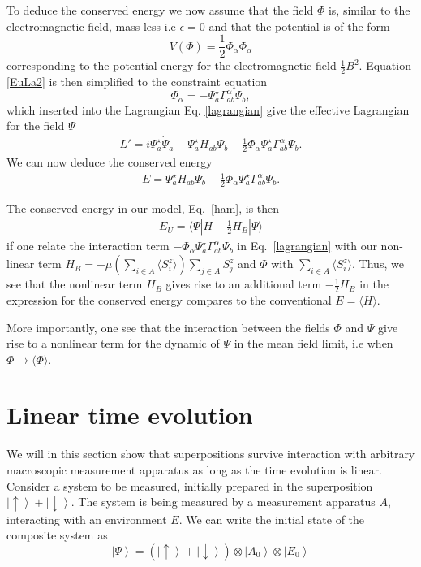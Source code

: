 \documentclass[showpacs,preprintnumbers,amsmath,amssymb,12pt]{revtex4-2}
\begin{document}
To deduce the conserved energy we now assume that the field $\Phi$ is,
similar to the electromagnetic field, mass-less i.e $\epsilon = 0$ and
that the potential is of the form
\begin{equation}
  V(\Phi)=\frac{1}{2}\Phi_\alpha \Phi_\alpha
  \label{potential}
\end{equation}
corresponding to the potential energy for the electromagnetic field
$\frac{1}{2}B^2$.
Equation \eqref{EuLa2} is then simplified to the constraint equation
\begin{equation}
  \Phi_{\alpha}=-\Psi_a^{\star}\Gamma_{ab}^{\alpha} \Psi_b,
  \label{constraint}
\end{equation} 
which inserted into the Lagrangian Eq. \eqref{lagrangian} give the
effective Lagrangian for the field $\Psi$
\begin{eqnarray}
  L' =  i\Psi_a^{\star} \dot{\Psi}_a- \Psi_a^{\star} H_{ab}\Psi_b
  -\frac{1}{2} \Phi_\alpha \Psi_a^{\star}\Gamma_{ab}^{\alpha} \Psi_b.
  \label{lagrangian2}
\end{eqnarray} 
We can now deduce the conserved energy
\begin{eqnarray}
  E = \Psi_a^{\star} H_{ab}\Psi_b
  +\frac{1}{2} \Phi_\alpha \Psi_a^{\star}\Gamma_{ab}^{\alpha} \Psi_b.
\label{conservedenergy}
\end{eqnarray} 

The conserved energy in our model, Eq.~\eqref{ham}, is then
\begin{eqnarray}
  E_U = \langle \Psi | H - \frac{1}{2} H_B |\Psi \rangle
\end{eqnarray}
if one relate the interaction term $-\Phi_{\alpha}
\Psi_a^{\star}\Gamma_{ab}^\alpha \Psi_b$ in Eq.~\eqref{lagrangian}
with our non-linear term $H_B = - \mu (\sum\limits_{i\in A} \langle
S_i^z\rangle ) \sum\limits_{j\in A} S_j^z$ and $\Phi$ with
$\sum\limits_{i\in A} \langle S_i^z\rangle$. Thus, we see that the
nonlinear term $H_B$ gives rise to an additional term
$-\frac{1}{2}H_B$ in the expression for the conserved energy compares
to the conventional $E=\langle H \rangle$. 

More importantly, one see that the interaction between the fields
$\Phi$ and $\Psi$ give rise to a nonlinear term for the dynamic of
$\Psi$ in the mean field limit, i.e when $\Phi \rightarrow \langle
\Phi \rangle$.


\section{Linear time evolution}
\label{App:lin}
We will in this section show that superpositions survive interaction
with arbitrary macroscopic measurement apparatus as long as the time
evolution is linear.  Consider a system to be measured, initially
prepared in the superposition
$\left|\uparrow\right\rangle+\left|\downarrow\right\rangle$.  The
system is being measured by a measurement apparatus $A$, interacting
with an environment $E$.  We can write the initial state of the
composite system as
\begin{equation}
\label{eq:initial}
\left|\Psi\right\rangle=(\left|\uparrow\right\rangle+
\left|\downarrow\right\rangle)\otimes\left|A_{0}\right\rangle\otimes\left|
  E_0\right\rangle 
\end{equation}
\end{document}
